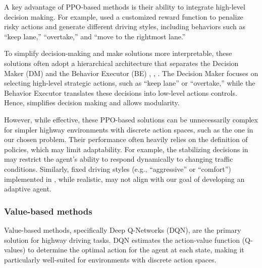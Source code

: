 \documentclass{article}
\begin{document}
A key advantage of PPO-based methods is their ability to integrate high-level decision making. For example, \citep{forneris_implementing_2023} used a customized reward function to penalize risky actions and generate different driving styles, including behaviors such as “keep lane,” “overtake,” and “move to the rightmost lane.” 

To simplify decision-making and make solutions more interpretable, these solutions often adopt a hierarchical architecture that separates the Decision Maker (DM) and the Behavior Executor (BE) \citep{pighetti_high-level_2022}, \citep{forneris_implementing_2023}, \citep{capello_investigating_2023}.
The Decision Maker focuses on selecting high-level strategic actions, such as “keep lane” or “overtake,” while the Behavior Executor translates these decisions into low-level actions controls. Hence, simplifies decision making and allows modularity.

However, while effective, these PPO-based solutions can be unnecessarily complex for simpler highway environments with discrete action spaces, such as the one in our chosen problem. Their performance often heavily relies on the definition of policies, which may limit adaptability. For example, the stabilizing decisions in \citep{pighetti_high-level_2022} may restrict the agent's ability to respond dynamically to changing traffic conditions. Similarly, fixed driving styles (e.g., “aggressive” or “comfort”) implemented in \citep{forneris_implementing_2023}, while realistic, may not align with our goal of developing an adaptive agent.



\subsubsection{Value-based methods}

Value-based methods, specifically Deep Q-Networks (DQN), are the primary solution for highway driving tasks. DQN estimates the action-value function (Q-values) to determine the optimal action for the agent at each state, making it particularly well-suited for environments with discrete action spaces.
\end{document}
